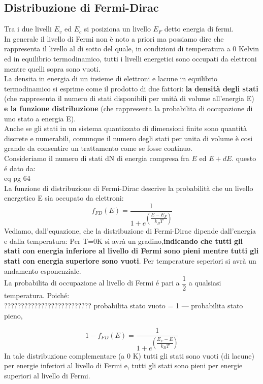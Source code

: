 \subsection{Distribuzione di Fermi-Dirac}
%
Tra i due livelli $E_v$ ed $E_c$ si posiziona un livello $E_F$ detto energia di fermi.\\
In generale il livello di Fermi non è noto a priori ma possiamo dire che rappresenta il livello al di sotto del quale, in condizioni di temperatura a 0 Kelvin ed in equilibrio termodinamico, tutti i livelli energetici sono occupati da elettroni mentre quelli sopra sono vuoti.\\
La densita in energia di un insieme di elettroni e lacune in equilibrio termodinamico si esprime come il prodotto di due
fattori: \textbf{la densità degli stati} (che rappresenta il numero di stati disponibili per unità di volume all'energia E) \textbf{e la funzione distribuzione} (che rappresenta la probabilita di occupazione di uno stato a energia E).\\
Anche se gli stati in un sistema quantizzato di dimensioni finite sono quantità discrete e numerabili, comunque il numero degli stati per unita di volume è cosi grande da consentire un trattamento come se fosse continuo. \\
Consideriamo il numero di stati dN di energia compresa fra
$E$ ed $E+dE$. questo é dato da: \\
%
 eq pg 64
 \\
La funzione di distribuzione di Fermi-Dirac descrive la probabilità che un livello energetico E sia occupato da elettroni:
%
\begin{equation}
    f_{FD}(E)=\dfrac{1}{1+e^{\left(\dfrac{E-E_F}{k_B T}\right)}}
\end{equation}
%
Vediamo, dall'equazione, che la distribuzione di Fermi-Dirac dipende dall'energia e dalla temperatura:
Per T=0K si avrà un gradino,\textbf{indicando che tutti gli stati con energia inferiore al livello di Fermi sono pieni mentre tutti gli stati con energia superiore sono vuoti}. Per temperature seperiori si avrà un andamento esponenziale.\\
La probabilita di occupazione al livello di Fermi é pari a $\dfrac{1}{2}$ a qualsiasi temperatura. Poiché: \\
??????????????????????????
probabilita stato vuoto = 1 — probabilita stato pieno, \\
\begin{exbox}
    \begin{equation}
    1-f_{FD}(E)=\dfrac{1}{1+e^{\left(\dfrac{E_F-E}{k_B T}\right)}}
    \end{equation}
    In tale distribuzione complementare (a 0 K) tutti gli stati sono vuoti (di lacune)
    per energie inferiori al livello di Fermi e, tutti gli stati sono pieni per energie superiori
    al livello di Fermi.
\end{exbox} 
